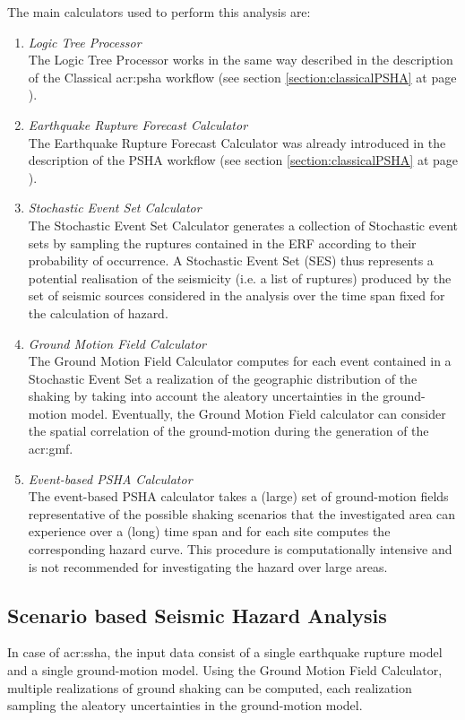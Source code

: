 The main calculators  used to perform this analysis are:
\begin{enumerate}
%
\item \emph{Logic Tree Processor} \hfill \\
The Logic Tree Processor works in the same way described in 
the description of the Classical \gls{acr:psha} workflow 
(see section \ref{section:classicalPSHA} at page 
\pageref{section:classicalPSHA}).
%
\item \emph{Earthquake Rupture Forecast Calculator} \hfill \\ 
The Earthquake Rupture Forecast Calculator was already 
introduced in the description of the PSHA workflow (see section 
\ref{section:classicalPSHA} at page \pageref{section:classicalPSHA}).
%
\item \emph{Stochastic Event Set Calculator} \hfill \\
The Stochastic Event Set Calculator generates a collection of Stochastic 
event sets by sampling the ruptures contained in the ERF according to their 
probability of occurrence. 
%
A Stochastic Event Set (SES) thus represents a potential realisation of the 
seismicity (i.e. a list of ruptures) produced by the set of seismic sources 
considered in the analysis over the time span fixed for the 
calculation of hazard. 
%
\item \emph{Ground Motion Field Calculator} \hfill \\
The Ground Motion Field Calculator computes for each event contained in a 
Stochastic Event Set a realization of the geographic distribution of the 
shaking by taking into account the aleatory uncertainties in 
the ground-motion model. Eventually, the Ground Motion Field calculator 
can consider the spatial correlation of the ground-motion during the 
generation of the \gls{acr:gmf}.
%
\item \emph{Event-based PSHA Calculator} \hfill \\
The event-based PSHA calculator takes a (large) set of ground-motion 
fields representative of the possible shaking scenarios that the investigated
area can experience over a (long) time span and for each 
site computes the corresponding hazard curve. 
%
This procedure is computationally intensive and is not recommended for 
investigating the hazard over large areas. 
\end{enumerate}
%
\subsection{Scenario based Seismic Hazard Analysis}
\label{section:deterministicSHA}
In case of \gls{acr:ssha}, the input data consist of a single earthquake 
rupture model and a single ground-motion model. Using the Ground Motion Field 
Calculator, multiple realizations of ground shaking can be computed, each 
realization sampling the aleatory uncertainties in the ground-motion model.

